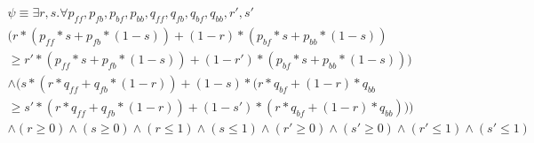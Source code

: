 \documentclass[12pt]{article}
\begin{document}
\begin {equation}
\begin{split}
    \psi \equiv \exists r,s . \forall p_{ff}, p_{fb}, p_{bf}, p_{bb}, q_{ff}, q_{fb}, q_{bf}, q_{bb}, r', s' \\ 
    (r*(p_{ff}*s + p_{fb}*(1-s)) + (1-r)*(p_{bf}*s + p_{bb}*(1-s)) \\ \geq r'*(p_{ff}*s + p_{fb}*(1-s)) + (1-r')*(p_{bf}*s + p_{bb}*(1-s))) \\ 
    \land (s*(r*q_{ff} + q_{fb} * (1-r)) + (1-s)*(r*q_{bf} + (1-r)*q_{bb} \\ \geq s'*(r*q_{ff} + q_{fb} * (1-r)) + (1-s')*(r*q_{bf} + (1-r)*q_{bb})))\\ \land (r \geq 0) \land (s \geq 0) \land (r \leq 1) \land (s \leq 1) \land (r' \geq 0) \land (s' \geq 0) \land (r' \leq 1) \land (s' \leq 1)
\end{split}
\end {equation}
\end{document}

